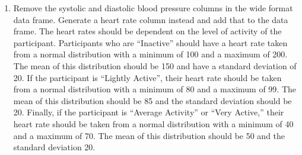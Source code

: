 \documentclass[
]{article}
\providecommand{\tightlist}{%
  \setlength{\itemsep}{0pt}\setlength{\parskip}{0pt}}
\begin{document}
\begin{enumerate}
\def\labelenumi{\arabic{enumi})}
\setcounter{enumi}{4}
\tightlist
\item
  Remove the systolic and diastolic blood pressure columns in the wide
  format data frame. Generate a heart rate column instead and add that
  to the data frame. The heart rates should be dependent on the level of
  activity of the participant. Participants who are ``Inactive'' should
  have a heart rate taken from a normal distribution with a minimum of
  100 and a maximum of 200. The mean of this distribution should be 150
  and have a standard deviation of 20. If the participant is ``Lightly
  Active'', their heart rate should be taken from a normal distribution
  with a minimum of 80 and a maximum of 99. The mean of this
  distribution should be 85 and the standard deviation should be 20.
  Finally, if the participant is ``Average Activity'' or ``Very
  Active,'' their heart rate should be taken from a normal distribution
  with a minimum of 40 and a maximum of 70. The mean of this
  distribution should be 50 and the standard deviation 20.
\end{enumerate}
\end{document}
